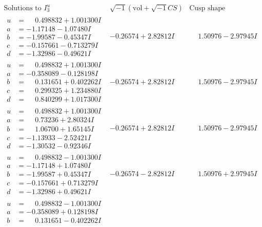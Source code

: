 \documentclass[1p]{elsarticle_modified}
\theoremstyle{definition}
\newcommand{\I}{\sqrt{-1}}
\begin{document}
$$\begin{array}{c|c|c}  
\text{Solutions to }I^u_{3}& \I (\text{vol} + \sqrt{-1}CS) & \text{Cusp shape}\\
 \hline 
\begin{aligned}
u &= \phantom{-}0.498832 + 1.001300 I \\
a &= -1.17148 - 1.07480 I \\
b &= -1.99587 - 0.45347 I \\
c &= -0.157661 - 0.713279 I \\
d &= -1.32986 - 0.49621 I\end{aligned}
 & -0.26574 + 2.82812 I & \phantom{-}1.50976 - 2.97945 I \\ \hline\begin{aligned}
u &= \phantom{-}0.498832 + 1.001300 I \\
a &= -0.358089 - 0.128198 I \\
b &= \phantom{-}0.131651 + 0.402262 I \\
c &= \phantom{-}0.299325 + 1.234880 I \\
d &= \phantom{-}0.840299 + 1.017300 I\end{aligned}
 & -0.26574 + 2.82812 I & \phantom{-}1.50976 - 2.97945 I \\ \hline\begin{aligned}
u &= \phantom{-}0.498832 + 1.001300 I \\
a &= \phantom{-}0.73236 + 2.80324 I \\
b &= \phantom{-}1.06700 + 1.65145 I \\
c &= -1.13933 - 2.52421 I \\
d &= -1.30532 - 0.92346 I\end{aligned}
 & -0.26574 + 2.82812 I & \phantom{-}1.50976 - 2.97945 I \\ \hline\begin{aligned}
u &= \phantom{-}0.498832 - 1.001300 I \\
a &= -1.17148 + 1.07480 I \\
b &= -1.99587 + 0.45347 I \\
c &= -0.157661 + 0.713279 I \\
d &= -1.32986 + 0.49621 I\end{aligned}
 & -0.26574 - 2.82812 I & \phantom{-}1.50976 + 2.97945 I \\ \hline\begin{aligned}
u &= \phantom{-}0.498832 - 1.001300 I \\
a &= -0.358089 + 0.128198 I \\
b &= \phantom{-}0.131651 - 0.402262 I \\

\end{aligned}
\end{array}$$
\end{document}

